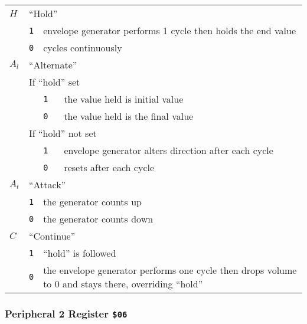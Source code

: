\documentclass[12pt,twoside,openright,a4paper]{book}
\begin{document}
	\hspace*{1.3cm}
	\begin{tabular}{lllp{18cm}}
		$H$ & \multicolumn{3}{l}{``Hold''} \\
			& {\tt 1} & \multicolumn{2}{p{10cm}}{envelope generator performs 1 cycle then holds the end value} \\
			& {\tt 0} & \multicolumn{2}{p{10cm}}{cycles continuously} \\

		$A_l$ & \multicolumn{3}{l}{``Alternate''} \\
			& \multicolumn{3}{l}{If ``hold'' set} \\
			& & {\tt 1} & the value held is initial value \\
			& & {\tt 0} & the value held is the final value \\
			& \multicolumn{3}{l}{If ``hold'' not set} \\
			& & {\tt 1} & envelope generator alters direction after each cycle \\
			& & {\tt 0} & resets after each cycle \\

		$A_t$ & \multicolumn{3}{l}{``Attack''} \\
			& {\tt 1} & \multicolumn{2}{l}{the generator counts up} \\
			& {\tt 0} & \multicolumn{2}{l}{the generator counts down} \\

		$C$ & \multicolumn{3}{l}{``Continue''} \\
			& {\tt 1} & \multicolumn{2}{l}{``hold'' is followed} \\
			& {\tt 0} & \multicolumn{2}{p{12cm}}{the envelope generator performs one cycle then drops volume to 0 and stays there, overriding ``hold''} \\
	\end{tabular}
\endgroup

\subsubsection{Peripheral 2 Register {\tt \$06}}
\end{document}
